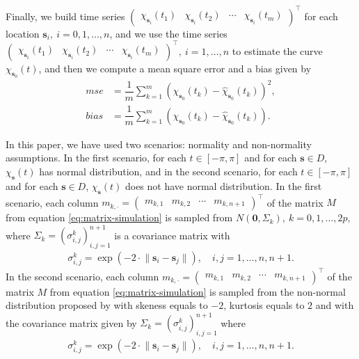 \documentclass[]{interact}
\theoremstyle{plain}%
\theoremstyle{definition}
\theoremstyle{remark}
\begin{document}
Finally, we build time series \(\begin{pmatrix} \chi_{\bm{s}_i}(t_1) & \chi_{\bm{s}_i}(t_2) & \cdots & \chi_{\bm{s}_i}(t_m) \end{pmatrix}^\top\) for each location \(\bm{s}_i,\ i =0,1,\dots, n\), and we use the time series \(\begin{pmatrix} \chi_{\bm{s}_i}(t_1) & \chi_{\bm{s}_i}(t_2) & \cdots & \chi_{\bm{s}_i}(t_m) \end{pmatrix}^\top,\ i =1, \dots, n\) to estimate the curve \(\chi_{\bm{s}_0}(t)\), and then we compute a mean square error and a bias given by
\begin{align*}
 mse &=   \dfrac{1}{m} \sum_{k=1}^{m} (\chi_{\bm{s}_0}(t_k) - \hat{\chi}_{\bm{s}_0}(t_k))^2,\\
 bias &=   \dfrac{1}{m} \sum_{k=1}^{m} (\chi_{\bm{s}_0}(t_k) - \hat{\chi}_{\bm{s}_0}(t_k)).
\end{align*}

In this paper, we have used two scenarios: normality and non-normality assumptions. In the first scenario, for each \(t \in [-\pi, \pi]\) and for each \(\bm{s} \in D\), \(\chi_{\bm{s}}(t)\) has normal distribution, and in the second scenario, for each \(t \in [-\pi, \pi]\) and for each \(\bm{s} \in D\), \(\chi_{\bm{s}}(t)\) does not have normal distribution. In the first scenario, each column \(m_{k,\cdot} = \begin{pmatrix} m_{k,1} & m_{k,2} & \cdots & m_{k,n+1} \end{pmatrix}^\top\) of the matrix \(M\) from equation \eqref{eq:matrix-simulation} is sampled from \(N(\bm{0}, \Sigma_k),\ k=0,1,\dots, 2p\), where \(\Sigma_k = (\sigma_{i,j}^k)_{i,j=1}^{n+1}\) is a covariance matrix with
\begin{align*}
 \sigma_{i,j}^k = \exp \left( -2 \cdot \lVert \bm{s}_i - \bm{s}_j \rVert \right), \quad i,j=1, \dots, n, n+1.
\end{align*}
In the second scenario, each column \(m_{k,\cdot} = \begin{pmatrix} m_{k,1} & m_{k,2} & \cdots & m_{k,n+1} \end{pmatrix}^\top\) of the matrix \(M\) from equation \eqref{eq:matrix-simulation} is sampled from the non-normal distribution proposed by \citet{Vale1983} with skeness equals to \(-2\), kurtosis equals to \(2\) and with the covariance matrix given by \(\Sigma_k = (\sigma_{i,j}^k)_{i,j=1}^{n+1}\) where
\begin{align*}
 \sigma_{i,j}^k = \exp \left( -2 \cdot \lVert \bm{s}_i - \bm{s}_j \rVert \right), \quad i,j=1, \dots, n, n+1.
\end{align*}
\end{document}
